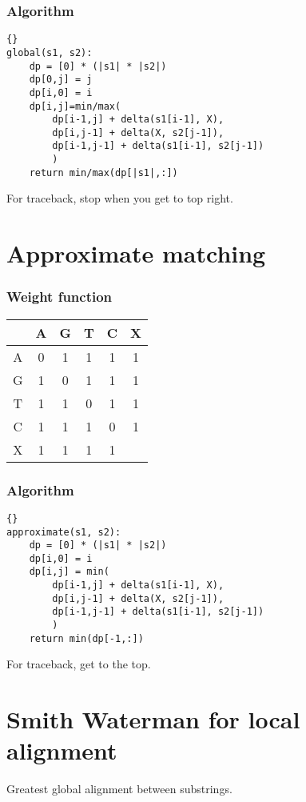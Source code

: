 \documentclass{article}
\begin{document}
\subsubsection*{Algorithm}
\begin{lstlisting}{}
global(s1, s2):
    dp = [0] * (|s1| * |s2|)
    dp[0,j] = j
    dp[i,0] = i
    dp[i,j]=min/max(
        dp[i-1,j] + delta(s1[i-1], X),
        dp[i,j-1] + delta(X, s2[j-1]),
        dp[i-1,j-1] + delta(s1[i-1], s2[j-1])
        )
    return min/max(dp[|s1|,:])
\end{lstlisting}
For traceback, stop when you get to top right.


\section{Approximate matching}
\subsubsection*{Weight function}
\begin{tabular}{c|c c c c c}
     & A & G & T & C & X\\
     \hline
    A & 0 & 1 & 1 & 1 & 1 \\
    G & 1 & 0 & 1 & 1 & 1 \\
    T & 1 & 1 & 0 & 1 & 1 \\
    C & 1 & 1 & 1 & 0 & 1 \\
    X & 1 & 1 & 1 & 1 & \\
\end{tabular}
\subsubsection*{Algorithm}
\begin{lstlisting}{}
approximate(s1, s2):
    dp = [0] * (|s1| * |s2|)
    dp[i,0] = i
    dp[i,j] = min(
        dp[i-1,j] + delta(s1[i-1], X),
        dp[i,j-1] + delta(X, s2[j-1]),
        dp[i-1,j-1] + delta(s1[i-1], s2[j-1])
        )
    return min(dp[-1,:])
\end{lstlisting}
For traceback, get to the top.

\section{Smith Waterman for local alignment}
Greatest global alignment between substrings.
\end{document}
